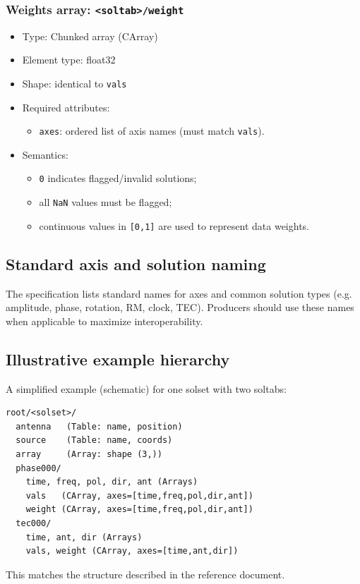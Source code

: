 \documentclass[a4paper,10pt,bibtotoc]{scrartcl}
\begin{document}
\subsubsection*{Weights array: \texttt{<soltab>/weight}}
\begin{itemize}
  \item Type: Chunked array (CArray)
  \item Element type: float32 
  \item Shape: identical to \texttt{vals}
  \item Required attributes:
  \begin{itemize}
    \item \texttt{axes}: ordered list of axis names (must match \texttt{vals}). 
  \end{itemize}
  \item Semantics:
  \begin{itemize}
    \item \texttt{0} indicates flagged/invalid solutions;
    \item all \texttt{NaN} values must be flagged;
    \item continuous values in \texttt{[0,1]} are used to represent data weights. 
  \end{itemize}
\end{itemize}


\subsection{Standard axis and solution naming}
The specification lists standard names for axes and common solution types (e.g. amplitude, phase,
rotation, RM, clock, TEC). Producers should use these names when applicable to maximize
interoperability. 

\subsection{Illustrative example hierarchy}
A simplified example (schematic) for one solset with two soltabs:
\begin{verbatim}
root/<solset>/
  antenna   (Table: name, position)
  source    (Table: name, coords)
  array     (Array: shape (3,))
  phase000/
    time, freq, pol, dir, ant (Arrays)
    vals   (CArray, axes=[time,freq,pol,dir,ant])
    weight (CArray, axes=[time,freq,pol,dir,ant])
  tec000/
    time, ant, dir (Arrays)
    vals, weight (CArray, axes=[time,ant,dir])
\end{verbatim}
This matches the structure described in the reference document. 
\end{document}
